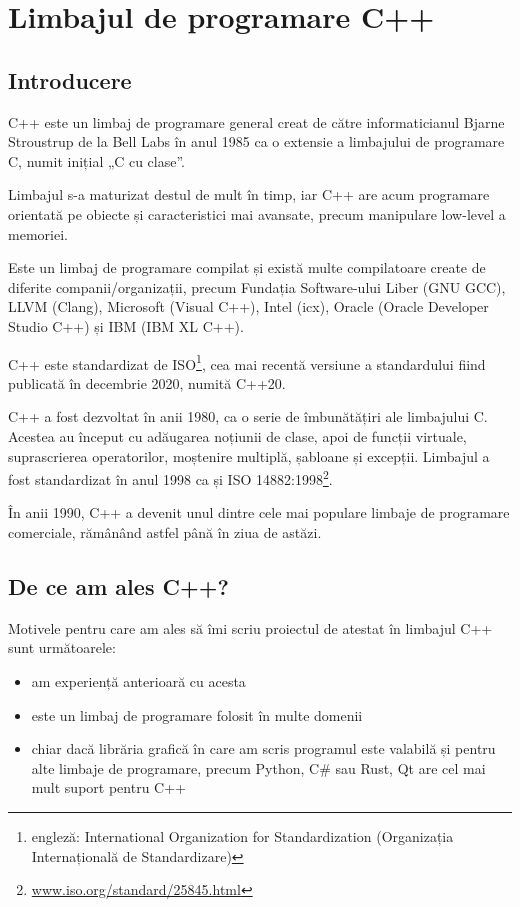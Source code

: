 \section{Limbajul de programare C++}
\subsection{Introducere}
C++ este un limbaj de programare general creat de către informaticianul Bjarne Stroustrup de la Bell Labs în anul 1985 ca o extensie a limbajului de programare C, numit inițial „C cu clase”.

Limbajul s-a maturizat destul de mult în timp, iar C++ are acum programare orientată pe obiecte și caracteristici mai avansate, precum manipulare low-level a memoriei.

Este un limbaj de programare compilat și există multe compilatoare create de diferite companii/organizații, precum Fundația Software-ului Liber (GNU GCC), LLVM (Clang), Microsoft (Visual C++), Intel (icx), Oracle (Oracle Developer Studio C++) și IBM (IBM XL C++).

C++ este standardizat de ISO\footnote{engleză: International Organization for Standardization (Organizația Internațională de Standardizare)}, cea mai recentă versiune a standardului fiind publicată în decembrie 2020, numită C++20.

C++ a fost dezvoltat în anii 1980, ca o serie de îmbunătățiri ale limbajului C. Acestea au început cu adăugarea noțiunii de clase, apoi de funcții virtuale, suprascrierea operatorilor, moștenire multiplă, șabloane și excepții. Limbajul a fost standardizat în anul 1998 ca și ISO 14882:1998\footnote{\url{www.iso.org/standard/25845.html}}.

În anii 1990, C++ a devenit unul dintre cele mai populare limbaje de programare comerciale, rămânând astfel până în ziua de astăzi.

\subsection{De ce am ales C++?}
Motivele pentru care am ales să îmi scriu proiectul de atestat în limbajul C++ sunt următoarele:
\begin{itemize}
 \item am experiență anterioară cu acesta
 \item este un limbaj de programare folosit în multe domenii
 \item chiar dacă librăria grafică în care am scris programul este valabilă și pentru alte limbaje de programare, precum Python, C\# sau Rust, Qt are cel mai mult suport pentru C++
\end{itemize}
